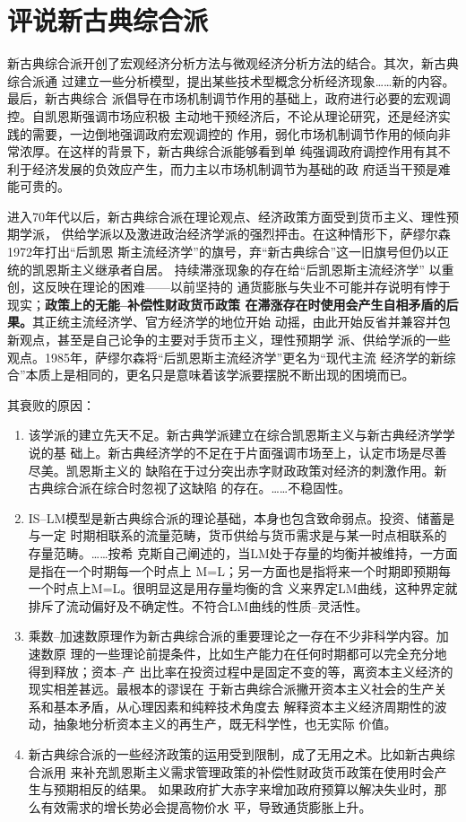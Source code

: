 \section{评说新古典综合派}

新古典综合派开创了宏观经济分析方法与微观经济分析方法的结合。其次，新古典综合派通
过建立一些分析模型，提出某些技术型概念分析经济现象……新的内容。最后，新古典综合
派倡导在市场机制调节作用的基础上，政府进行必要的宏观调控。自凯恩斯强调市场应积极
主动地干预经济后，不论从理论研究，还是经济实践的需要，一边倒地强调政府宏观调控的
作用，弱化市场机制调节作用的倾向非常浓厚。在这样的背景下，新古典综合派能够看到单
纯强调政府调控作用有其不利于经济发展的负效应产生，而力主以市场机制调节为基础的政
府适当干预是难能可贵的。

进入70年代以后，新古典综合派在理论观点、经济政策方面受到货币主义、理性预期学派，
供给学派以及激进政治经济学派的强烈抨击。在这种情形下，萨缪尔森1972年打出“后凯恩
斯主流经济学”的旗号，弃“新古典综合”这一旧旗号但仍以正统的凯恩斯主义继承者自居。
持续滞涨现象的存在给“后凯恩斯主流经济学” 以重创，这反映在理论的困难——以前坚持的
通货膨胀与失业不可能并存说明有悖于现实；\textbf{政策上的无能--补偿性财政货币政策
  在滞涨存在时使用会产生自相矛盾的后果。}其正统主流经济学、官方经济学的地位开始
动摇，由此开始反省并兼容并包新观点，甚至是自己论争的主要对手货币主义，理性预期学
派、供给学派的一些观点。1985年，萨缪尔森将“后凯恩斯主流经济学”更名为“现代主流
经济学的新综合”本质上是相同的，更名只是意味着该学派要摆脱不断出现的困境而已。

其衰败的原因：
\begin{enumerate}
\item 该学派的建立先天不足。新古典学派建立在综合凯恩斯主义与新古典经济学学说的基
  础上。新古典经济学的不足在于片面强调市场至上，认定市场是尽善尽美。凯恩斯主义的
  缺陷在于过分突出赤字财政政策对经济的刺激作用。新古典综合派在综合时忽视了这缺陷
  的存在。……不稳固性。


\item IS--LM模型是新古典综合派的理论基础，本身也包含致命弱点。投资、储蓄是与一定
  时期相联系的流量范畴，货币供给与货币需求是与某一时点相联系的存量范畴。……按希
  克斯自己阐述的，当LM处于存量的均衡并被维持，一方面是指在一个时期每一个时点上
  M=L；另一方面也是指将来一个时期即预期每一个时点上M=L。很明显这是用存量均衡的含
  义来界定LM曲线，这种界定就排斥了流动偏好及不确定性。不符合LM曲线的性质--灵活性。


\item 乘数--加速数原理作为新古典综合派的重要理论之一存在不少非科学内容。加速数原
  理的一些理论前提条件，比如生产能力在任何时期都可以完全充分地得到释放；资本--产
  出比率在投资过程中是固定不变的等，离资本主义经济的现实相差甚远。最根本的谬误在
  于新古典综合派撇开资本主义社会的生产关系和基本矛盾，从心理因素和纯粹技术角度去
  解释资本主义经济周期性的波动，抽象地分析资本主义的再生产，既无科学性，也无实际
  价值。


\item 新古典综合派的一些经济政策的运用受到限制，成了无用之术。比如新古典综合派用
  来补充凯恩斯主义需求管理政策的补偿性财政货币政策在使用时会产生与预期相反的结果。
  如果政府扩大赤字来增加政府预算以解决失业时，那么有效需求的增长势必会提高物价水
  平，导致通货膨胀上升。
\end{enumerate}

